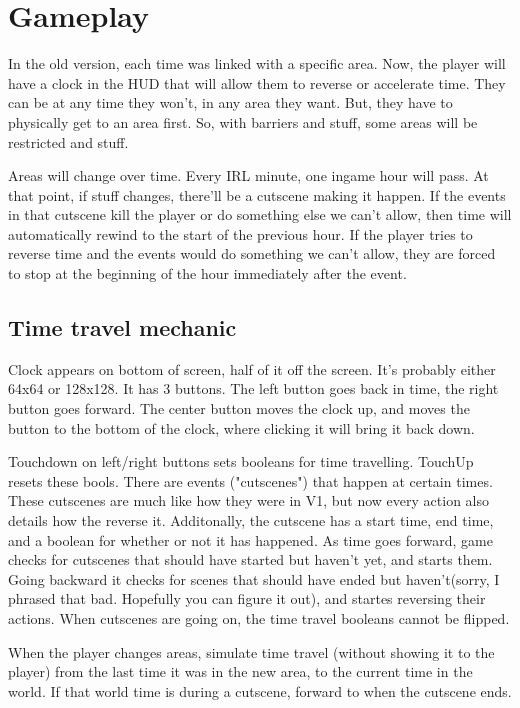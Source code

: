 \documentclass[a4paper,12pt]{article}
\begin{document}
  \section{Gameplay}
  In the old version, each time was linked with a specific area. Now, the player will have a clock in the HUD that will allow them to reverse or accelerate time. They can be at any time they won't, in any area they want. But, they have to physically get to an area first. So, with barriers and stuff, some areas will be restricted and stuff.

  Areas will change over time. Every IRL minute, one ingame hour will pass. At that point, if stuff changes, there'll be a cutscene making it happen. If the events in that cutscene kill the player or do something else we can't allow, then time will automatically rewind to the start of the previous hour. If the player tries to reverse time and the events would do something we can't allow, they are forced to stop at the beginning of the hour immediately after the event.

  \subsection{Time travel mechanic}
  Clock appears on bottom of screen, half of it off the screen. It's probably either 64x64 or 128x128. It has 3 buttons. The left button goes back in time, the right button goes forward. The center button moves the clock up, and moves the button to the bottom of the clock, where clicking it will bring it back down.

  Touchdown on left/right buttons sets booleans for time travelling. TouchUp resets these bools. There are events ("cutscenes") that happen at certain times. These cutscenes are much like how they were in V1, but now every action also details how the reverse it. Additonally, the cutscene has a start time, end time, and a boolean for whether or not it has happened. As time goes forward, game checks for cutscenes that should have started but haven't yet, and starts them. Going backward it checks for scenes that should have ended but haven't(sorry, I phrased that bad. Hopefully you can figure it out), and startes reversing their actions. When cutscenes are going on, the time travel booleans cannot be flipped.

  When the player changes areas, simulate time travel (without showing it to the player) from the last time it was in the new area, to the current time in the world. If that world time is during a cutscene, forward to when the cutscene ends.
\end{document}
